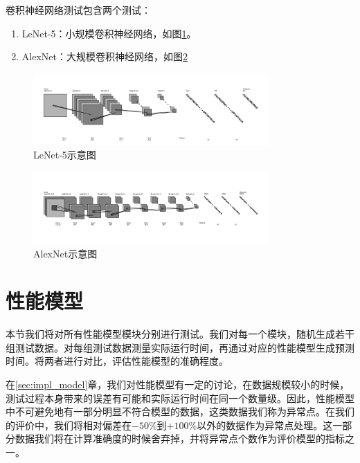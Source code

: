     卷积神经网络测试包含两个测试：
    
    \begin{enumerate}
        \item LeNet-5：小规模卷积神经网络，如图\ref{fig:lenet5_str}。
        \item AlexNet：大规模卷积神经网络，如图\ref{fig:alexnet_str}
    \end{enumerate}
    
    \begin{figure}[!htbp]
        \centering
        \includegraphics[width=0.8\textwidth]{figures/lenet5_str.png}
        \caption{LeNet-5示意图}
        \label{fig:lenet5_str}
    \end{figure}

    \begin{figure}[!htbp]
        \centering
        \includegraphics[width=0.8\textwidth]{figures/alexnet_str.png}
        \caption{AlexNet示意图}
        \label{fig:alexnet_str}
    \end{figure}

\section{性能模型}
    本节我们将对所有性能模型模块分别进行测试。我们对每一个模块，随机生成若干组测试数据。对每组测试数据测量实际运行时间，再通过对应的性能模型生成预测时间。将两者进行对比，评估性能模型的准确程度。
    
    在\ref{sec:impl_model}章，我们对性能模型有一定的讨论，在数据规模较小的时候，测试过程本身带来的误差有可能和实际运行时间在同一个数量级。因此，性能模型中不可避免地有一部分明显不符合模型的数据，这类数据我们称为异常点。在我们的评价中，我们将相对偏差在$ -50\% $到$ +100\% $以外的数据作为异常点处理。这一部分数据我们将在计算准确度的时候舍弃掉，并将异常点个数作为评价模型的指标之一。
    
